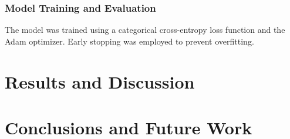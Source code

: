 \documentclass[conference]{IEEEtran}
\begin{document}
\subsubsection{Model Training and Evaluation}

The model was trained using a categorical cross-entropy loss function and the Adam optimizer. Early stopping was employed to prevent overfitting.













\section{Results and Discussion}

\blindtext[2]

\section{Conclusions and Future Work}

\blindtext[3]




 

\end{document}
